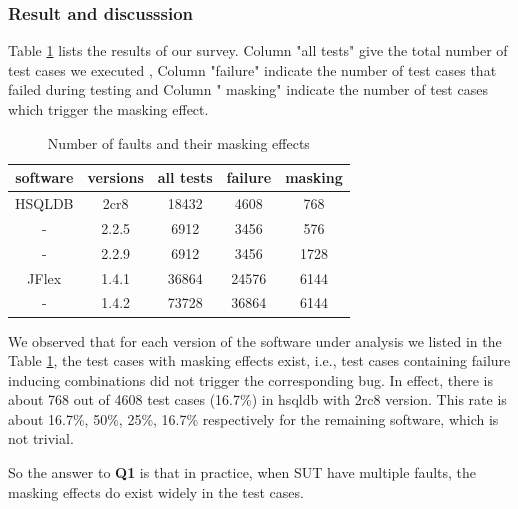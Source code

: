 \documentclass{sig-alternate}
\begin{document}
\subsubsection{Result and discusssion}

Table \ref{masking effect condition} lists the results of our survey. Column "all tests" give the total number of test cases we executed , Column "failure" indicate the number of test cases that failed during testing and Column " masking" indicate the number of test cases which trigger the masking effect.


\begin{table}\renewcommand{\arraystretch}{1.3}
\caption{Number of faults and their masking effects}
\label{masking effect condition}
\begin{tabular}{c|c|c|c|c} \hline
software & versions & all tests & failure & masking\\ \hline
HSQLDB & 2cr8 & 18432 & 4608 & 768\\ \hline
     - & 2.2.5 & 6912 & 3456 & 576\\ \hline
     - & 2.2.9 & 6912 & 3456 &1728\\ \hline
JFlex & 1.4.1 & 36864 & 24576 &6144\\ \hline
     -& 1.4.2 & 73728 & 36864 &6144\\ \hline
\hline\end{tabular}
\end{table}

We observed that for each version of the software under analysis we listed in the Table \ref{masking effect condition}, the test cases with masking effects exist, i.e., test cases containing failure inducing combinations did not trigger the corresponding bug. In effect, there is about 768 out of 4608 test cases (16.7\%) in hsqldb with 2rc8 version. This rate is about 16.7\%, 50\%, 25\%, 16.7\% respectively for the remaining software, which is not trivial.

So the answer to \textbf{Q1} is that in practice, when SUT have multiple faults, the masking effects do exist widely in the test cases.

%
%
\end{document}
